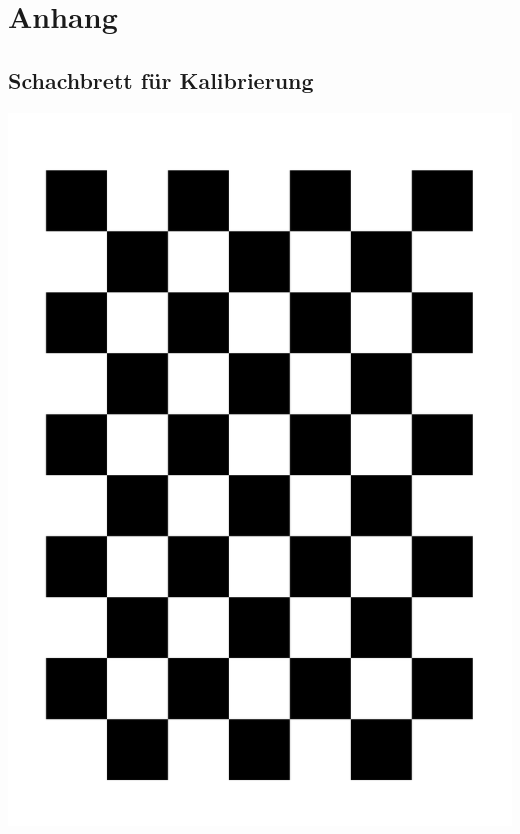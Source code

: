 \chapter{Anhang}

\section{Schachbrett für Kalibrierung}

\newpage

\includegraphics[width=\textwidth]{images/chessboard}

